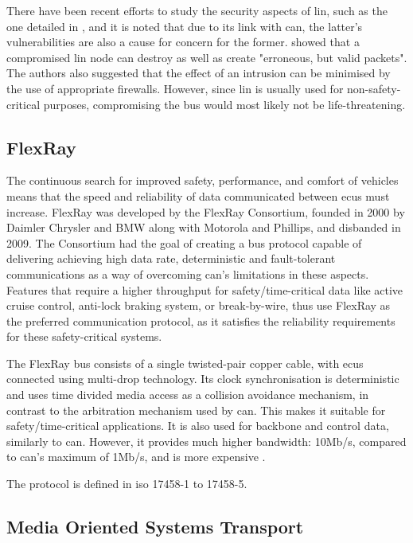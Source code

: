 There have been recent efforts to study the security aspects of \gls{lin}, such as the one detailed in \citep{Takahashi2017}, and it is noted that due to its link with \gls{can}, the latter’s vulnerabilities are also a cause for concern for the former. \citep{Ernst2018} showed that a compromised \gls{lin} node can destroy as well as create "erroneous, but valid packets". The authors also suggested that the effect of an intrusion can be minimised by the use of appropriate firewalls. However, since \gls{lin} is usually used for non-safety-critical purposes, compromising the bus would most likely not be life-threatening.

\subsection{FlexRay}

The continuous search for improved safety, performance, and comfort of vehicles means that the speed and reliability of data communicated between \glspl{ecu} must increase. FlexRay was developed by the FlexRay Consortium, founded in 2000 by Daimler Chrysler and BMW along with Motorola and Phillips, and disbanded in 2009. The Consortium had the goal of creating a bus protocol capable of delivering achieving high data rate, deterministic and fault-tolerant communications \citep{FlexRayFreescale} as a way of overcoming \gls{can}'s limitations in these aspects. Features that require a higher throughput for safety/time-critical data like active cruise control, anti-lock braking system, or break-by-wire, thus use FlexRay as the preferred communication protocol, as it satisfies the reliability requirements for these safety-critical systems.\par
The FlexRay bus consists of a single twisted-pair copper cable, with \glspl{ecu} connected using multi-drop technology. Its clock synchronisation is deterministic and uses time divided media access as a collision avoidance mechanism, in contrast to the arbitration mechanism used by \gls{can}. This makes it suitable for safety/time-critical applications. It is also used for backbone and control data, similarly to \gls{can}. However, it provides much higher bandwidth: 10Mb/s, compared to \gls{can}'s maximum of 1Mb/s, and is more expensive \citep{Huang2019}.\par
The protocol is defined in \gls{iso} 17458-1 to 17458-5.

\subsection{Media Oriented Systems Transport}

